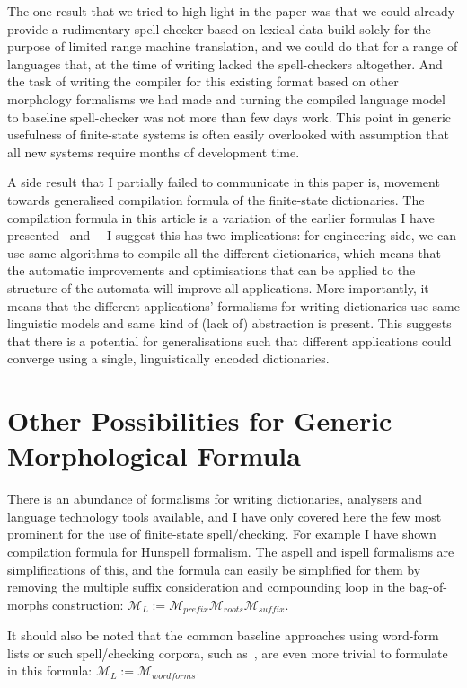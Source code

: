 \documentclass[officiallayout]{unihelcompling}
\begin{document}
The one result that we tried to high-light in the paper was that we could
already provide a rudimentary spell-checker-based on lexical data build solely
for the purpose of limited range machine translation, and we could do that for
a range of languages that, at the time of writing lacked the spell-checkers
altogether. And the task of writing the compiler for this existing format
based on other morphology formalisms we had made and turning the compiled
language model to baseline spell-checker was not more than few days work. This
point in generic usefulness of finite-state systems is often easily overlooked
with assumption that all new systems require months of development time.

A side result that I partially failed to communicate in this paper is, movement
towards generalised compilation formula of the finite-state dictionaries. The
compilation formula in this article is a variation of the earlier formulas I
have presented~\citep{linden2009hfst} and ---I
suggest this has two implications: for engineering side, we can use same
algorithms to compile all the different dictionaries, which means that the
automatic improvements and optimisations that can be applied to the structure
of the automata will improve all applications. More importantly, it means that
the different applications' formalisms for writing dictionaries use same
linguistic models and same kind of (lack of) abstraction is present. This
suggests that there is a potential for generalisations such that different
applications could converge using a single, linguistically encoded
dictionaries.

\section{Other Possibilities for Generic Morphological Formula}
\label{sec:other-lms}

There is an abundance of formalisms for writing dictionaries, analysers and
language technology tools available, and I have only covered here the few most
prominent for the use of finite-state spell\-/checking. For example I have shown
compilation formula for Hunspell formalism. The aspell and ispell formalisms
are simplifications of this, and the formula can easily be simplified for them
by removing the multiple suffix consideration and compounding loop in the
bag-of-morphs construction: $\mathcal{M}_L := \mathcal{M}_{prefix}
\mathcal{M}_{roots} \mathcal{M}_{suffix}$.

It should also be noted that the common baseline approaches using word-form
lists or such spell\-/checking corpora, such as~\citet{norvig2010howto}, are even
more trivial to formulate in this formula: $\mathcal{M}_L :=
\mathcal{M}_{wordforms}$.
\end{document}
